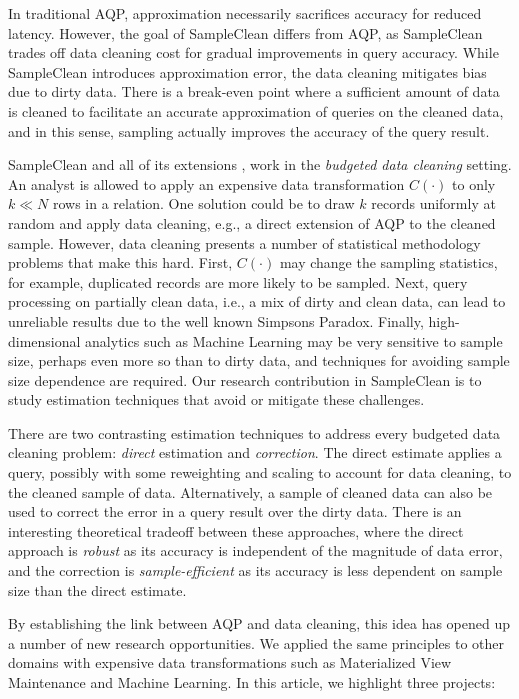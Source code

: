 In traditional AQP, approximation necessarily sacrifices accuracy for reduced latency. 
However, the goal of SampleClean differs from AQP, as SampleClean trades off data cleaning cost for gradual improvements in query accuracy.
While SampleClean introduces approximation error, the data cleaning mitigates bias due to dirty data.
There is a break-even point where a sufficient amount of data is cleaned to facilitate an accurate approximation of queries on the cleaned data, and in this sense, sampling actually improves the accuracy of the query result.

SampleClean \cite{wang1999sample} and all of its extensions \cite{krishnan2015svc,krishnan2015acl,haas2015wisteria}, work in the \emph{budgeted data cleaning} setting. 
An analyst is allowed to apply an expensive data transformation $C(\cdot)$ to only $k\ll N$ rows in a relation.
One solution could be to draw $k$ records uniformly at random and apply data cleaning, e.g., a direct extension of AQP \cite{AgarwalMPMMS13} to the cleaned sample.
However, data cleaning presents a number of statistical methodology problems that make this hard.
First, $C(\cdot)$ may change the sampling statistics, for example, duplicated records are more likely to be sampled.
Next, query processing on partially clean data, i.e., a mix of dirty and clean data, can lead to unreliable results due to the well known Simpsons Paradox.
Finally, high-dimensional analytics such as Machine Learning may be very sensitive to sample size, perhaps even more so than to dirty data, and techniques for avoiding sample size dependence are required.
Our research contribution in SampleClean is to study estimation techniques that avoid or mitigate these challenges.

There are two contrasting estimation techniques to address every budgeted data cleaning problem: \emph{direct} estimation and \emph{correction}.
The direct estimate applies a query, possibly with some reweighting and scaling to account for data cleaning, to the cleaned sample of data. 
Alternatively, a sample of cleaned data can also be used to correct the error in a query result over the dirty data.
There is an interesting theoretical tradeoff between these approaches, where the direct approach is \emph{robust} as its accuracy is independent of the magnitude of data error, and the correction is \emph{sample-efficient} as its accuracy is less dependent on sample size than the direct estimate.

By establishing the link between AQP and data cleaning, this idea has opened up a number of new research opportunities. 
We applied the same principles to other domains with expensive data transformations such as Materialized View Maintenance and Machine Learning.
In this article, we highlight three projects:

